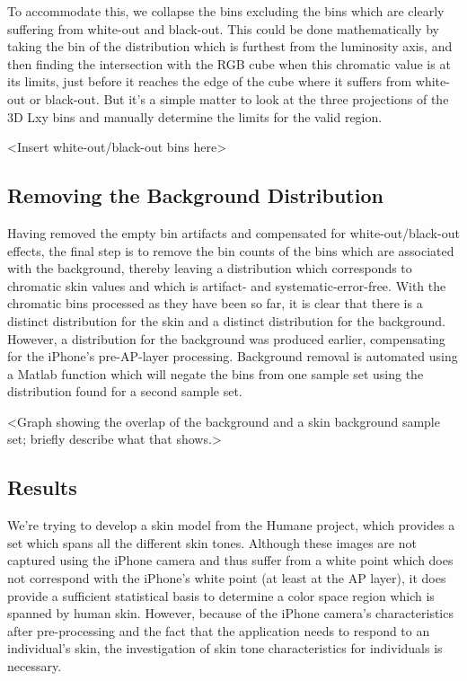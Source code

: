 To accommodate this, we collapse the bins excluding the bins which are clearly suffering from white-out and black-out. This could be done mathematically by taking the bin of the distribution which is furthest from the luminosity axis, and then finding the intersection with the RGB cube when this chromatic value is at its limits, just before it reaches the edge of the cube where it suffers from white-out or black-out. But it's a simple matter to look at the three projections of the 3D Lxy bins and manually determine the limits for the valid region.

<Insert white-out/black-out bins here>

\subsection{Removing the Background Distribution}\label{sec:RemovingBGDistribution}

Having removed the empty bin artifacts and compensated for white-out/black-out effects, the final step is to remove the bin counts of the bins which are associated with the background, thereby leaving a distribution which corresponds to chromatic skin values and which is artifact- and systematic-error-free. With the chromatic bins processed as they have been so far, it is clear that there is a distinct distribution for the skin and a distinct distribution for the background. However, a distribution for the background was produced earlier, compensating for the iPhone's pre-AP-layer processing. Background removal is automated using a Matlab function which will negate the bins from one sample set using the distribution found for a second sample set.

<Graph showing the overlap of the background and a skin background sample set; briefly describe what that shows.>

\subsection{Results}\label{sec:Results}

We're trying to develop a skin model from the Humane project, which provides a set which spans all the different skin tones. Although these images are not captured using the iPhone camera and thus suffer from a white point which does not correspond with the iPhone's white point (at least at the AP layer), it does provide a sufficient statistical basis to determine a color space region which is spanned by human skin. However, because of the iPhone camera's characteristics after pre-processing and the fact that the application needs to respond to an individual's skin, the investigation of skin tone characteristics for individuals is necessary.

